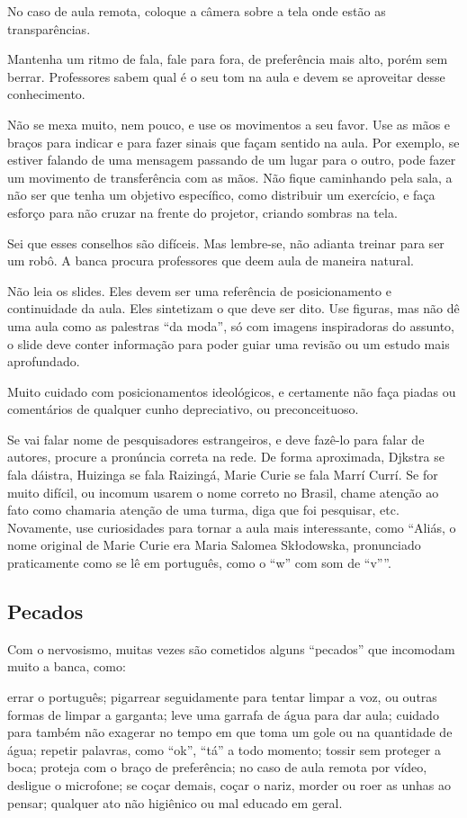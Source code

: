 \documentclass{article}
\begin{document}
No caso de aula remota, coloque a câmera sobre a tela onde estão as transparências.

Mantenha um ritmo de fala, fale para fora, de preferência mais alto, porém sem berrar. Professores sabem qual é o seu tom na aula e devem se aproveitar desse conhecimento.

Não se mexa muito, nem pouco, e use os movimentos a seu favor.  Use as mãos e braços para indicar e para fazer sinais que façam sentido na aula. Por exemplo, se estiver falando de uma mensagem passando de um lugar para o outro, pode fazer um movimento de transferência com as mãos. Não fique caminhando pela sala, a não ser que tenha um objetivo específico, como distribuir um exercício, e faça esforço para não cruzar na frente do projetor, criando sombras na tela.

Sei que esses conselhos são difíceis. Mas lembre-se, não adianta treinar para ser um robô. A banca procura professores que deem aula de maneira natural.


Não leia os slides. Eles devem ser uma referência de posicionamento e continuidade da aula. Eles sintetizam o que deve ser dito. Use figuras, mas não dê uma aula como as palestras ``da moda'', só com imagens inspiradoras do assunto, o slide deve conter informação para poder guiar uma revisão ou um estudo mais aprofundado.

Muito cuidado com posicionamentos ideológicos, e certamente não faça piadas ou comentários de qualquer cunho depreciativo, ou preconceituoso.


Se vai falar nome de pesquisadores estrangeiros, e deve fazê-lo para falar de autores, procure a pronúncia correta na rede. De forma aproximada, Djkstra se fala dáistra, Huizinga se fala Raizingá, Marie Curie se fala Marrí Currí. Se for muito difícil, ou incomum usarem o nome correto no Brasil, chame atenção ao fato como chamaria atenção de uma turma, diga que foi pesquisar, etc. Novamente, use curiosidades para tornar a aula mais interessante, como ``Aliás, o nome original de Marie Curie era Maria Salomea Sk\l odowska, pronunciado praticamente como se lê em português, como o ``w'' com som de ``v''''.

\subsection{Pecados}

Com o nervosismo, muitas vezes são cometidos alguns ``pecados'' que incomodam muito a banca, como:
\begin{outline}
\1 errar o português;
\1 pigarrear seguidamente para tentar limpar a voz, ou outras formas de limpar a garganta;
\2 leve uma garrafa de água para dar aula;
\3 cuidado para também não exagerar no tempo em que toma um gole ou na quantidade de água;
\1 repetir palavras, como ``ok'', ``tá'' a todo momento;
\1 tossir sem proteger a boca;
\2 proteja com o braço de preferência;
\2 no caso de aula remota por vídeo, desligue o microfone;
\1 se coçar demais, coçar o nariz, morder ou roer as unhas ao pensar;
\1 qualquer ato não higiênico ou mal educado em geral.
\end{outline}
\end{document}
